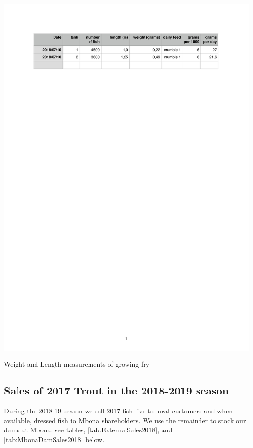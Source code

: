 \begin{table}[H]
  \centering
  \includegraphics[scale = 0.9]{tables/TablesFryGrowth.pdf}
   \caption{Weight and Length measurements of growing fry}
   \label{tab:FryGrowth}
\end{table}

\subsection{Sales of 2017 Trout in the 2018-2019 season}

During the 2018-19 season we sell 2017 fish live to local customers and 
when available, dressed fish to Mbona shareholders. We use the remainder
to stock our dams at Mbona. see tables, \ref{tab:ExternalSales2018}, 
 and \ref{tab:MbonaDamSales2018} below.

